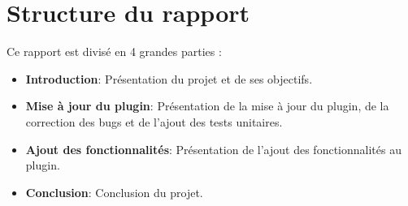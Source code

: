 \section{Structure du rapport}
\noindent
Ce rapport est divisé en 4 grandes parties :
\begin{itemize}
    \item \textbf{Introduction}: Présentation du projet et de ses objectifs.
    \item \textbf{Mise à jour du plugin}: Présentation de la mise à jour du plugin, de la correction des bugs et de l'ajout des tests unitaires.
    \item \textbf{Ajout des fonctionnalités}: Présentation de l'ajout des fonctionnalités au plugin.
    \item \textbf{Conclusion}: Conclusion du projet.
\end{itemize}